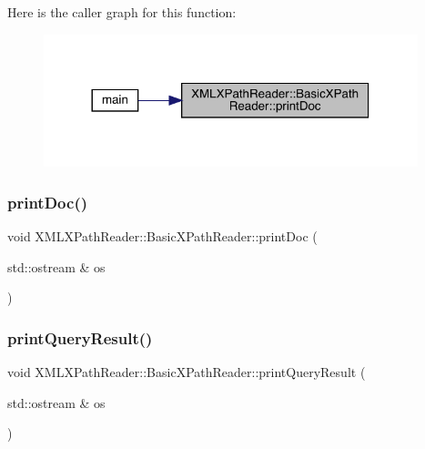 Here is the caller graph for this function\+:\nopagebreak
\begin{figure}[H]
\begin{center}
\leavevmode
\includegraphics[width=308pt]{d6/dbf/classXMLXPathReader_1_1BasicXPathReader_ab4607adfbae13b0ce3c7e5b944342207_icgraph}
\end{center}
\end{figure}
\mbox{\label{classXMLXPathReader_1_1BasicXPathReader_ab4607adfbae13b0ce3c7e5b944342207}} 
\subsubsection{\texorpdfstring{printDoc()}{printDoc()}\hspace{0.1cm}{\footnotesize\ttfamily [2/2]}}
{\footnotesize\ttfamily void X\+M\+L\+X\+Path\+Reader\+::\+Basic\+X\+Path\+Reader\+::print\+Doc (\begin{DoxyParamCaption}\item[{std\+::ostream \&}]{os }\end{DoxyParamCaption})}

\mbox{\label{classXMLXPathReader_1_1BasicXPathReader_a719ba9bbd4ae77d6be9a6544a2d0ccaf}} 
\subsubsection{\texorpdfstring{printQueryResult()}{printQueryResult()}\hspace{0.1cm}{\footnotesize\ttfamily [1/2]}}
{\footnotesize\ttfamily void X\+M\+L\+X\+Path\+Reader\+::\+Basic\+X\+Path\+Reader\+::print\+Query\+Result (\begin{DoxyParamCaption}\item[{std\+::ostream \&}]{os }\end{DoxyParamCaption})}

